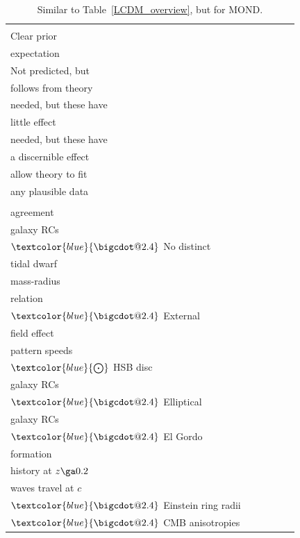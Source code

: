 \documentclass[fleqn,usenatbib,useAMS]{mnras} %
\makeatletter
\DeclareRobustCommand*\bigcdot{\mathpalette\bigcdot@{2.4}}
\DeclareRobustCommand*\bigcdot@[2]{\mathbin{\vcenter{\hbox{\scalebox{#2}{$\m@th#1\bullet$}}}}}
\makeatother
\begin{document}
\begin{table}
	\centering
	\caption{Similar to Table~\ref{LCDM_overview}, but for MOND.}
	\begin{tabular}{llllll}
		\hline
		\makecell{} & \makecell{\\ Clear prior \\ expectation} & \makecell{\\ Not predicted, but \\ follows from theory} & \makecell{Auxiliary assumptions \\ needed, but these have \\ little effect} & \makecell{Auxiliary assumptions \\ needed, but these have \\ a discernible effect} & \makecell{Auxiliary assumptions \\ allow theory to fit \\ any plausible data} \\ \hline
		\makecell{Excellent \\ agreement} & \makecell{$\textcolor{blue}{\bigcdot}$ LSB disc \\ galaxy RCs \\ $\textcolor{blue}{\bigcdot}$ No distinct \\ tidal dwarf \\ mass-radius \\ relation \\ $\textcolor{blue}{\bigcdot}$ External \\ field effect} & \makecell{$\textcolor{blue}{\bigcdot}$ Galaxy bar \\ pattern speeds \\ $\textcolor{blue}{\bigodot}$ HSB disc \\ galaxy RCs \\ $\textcolor{blue}{\bigcdot}$ Elliptical \\ galaxy RCs \\ $\textcolor{blue}{\bigcdot}$ El Gordo \\ formation} & & \makecell{$\textcolor{blue}{\bigcdot}$ Expansion \\ history at $z \ga 0.2$} & \makecell{$\textcolor{blue}{\bigcdot}$ Gravitational \\ waves travel at $c$ \\ $\textcolor{blue}{\bigcdot}$ Einstein ring radii \\ $\textcolor{blue}{\bigcdot}$ CMB anisotropies} \\ \hline

\end{tabular}
\end{table}
\end{document}
